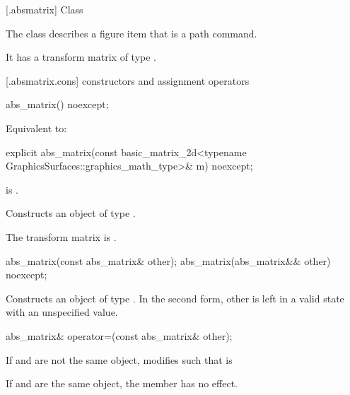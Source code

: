  [\iotwod.absmatrix] {Class }%

\pnum
{}%
The class  describes a figure item that is a path command.

\pnum
It has a transform matrix of type .

 [\iotwod.absmatrix.cons] { constructors and assignment operators}

%
\begin{itemdecl}
abs_matrix() noexcept;
\end{itemdecl}
\begin{itemdescr}
\pnum
\effects
Equivalent to: 
\end{itemdescr}

%
\begin{itemdecl}
explicit abs_matrix(const basic_matrix_2d<typename
  GraphicsSurfaces::graphics_math_type>& m) noexcept;
\end{itemdecl}
\begin{itemdescr}
\pnum
\requires
{} is .

\pnum
\effects
Constructs an object of type .

\pnum
The transform matrix is .
\end{itemdescr}

%
\begin{itemdecl}
abs_matrix(const abs_matrix& other);
abs_matrix(abs_matrix&& other) noexcept;
\end{itemdecl}
\begin{itemdescr}
\pnum
\effects
Constructs an object of type . In the second form, other is left in a valid state with an unspecified value.
\end{itemdescr}

%
\begin{itemdecl}
abs_matrix& operator=(const abs_matrix& other);
\end{itemdecl}
\begin{itemdescr}
\pnum
\effects
If  and  are not the same object, modifies  such that  is 

\pnum
If  and  are the same object, the member has no effect.

\pnum
\returns
{}
\end{itemdescr}

